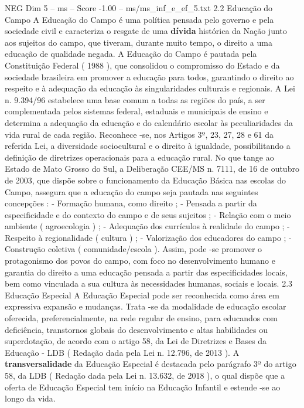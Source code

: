 \begin{textsample}{NEG Dim 5 – ms – Score -1.00 – ms/ms\_inf\_e\_ef\_5.txt}  \label{ex:f5_neg_079}
2.2 Educação do Campo A Educação do Campo é uma política pensada pelo governo e pela sociedade civil e caracteriza o resgate de uma \textbf{dívida} histórica da Nação junto aos sujeitos do campo, que tiveram, durante muito tempo, o direito a uma educação de qualidade negada.
A Educação do Campo é pautada pela Constituição Federal ( 1988 ), que consolidou o compromisso do Estado e da sociedade brasileira em promover a educação para todos, garantindo o direito ao respeito e à adequação da educação às singularidades culturais e regionais.
A Lei n. 9.394/96 estabelece uma base comum a todas as regiões do país, a ser complementada pelos sistemas federal, estaduais e municipais de ensino e determina a adequação da educação e do calendário escolar às peculiaridades da vida rural de cada região.
Reconhece -se, nos Artigos 3º, 23, 27, 28 e 61 da referida Lei, a diversidade sociocultural e o direito à igualdade, possibilitando a definição de diretrizes operacionais para a educação rural.
No que tange ao Estado de Mato Grosso do Sul, a Deliberação CEE/MS n. 7111, de 16 de outubro de 2003, que dispõe sobre o funcionamento da Educação Básica nas escolas do Campo, assegura que a educação do campo seja pautada nas seguintes concepções : - Formação humana, como direito ; - Pensada a partir da especificidade e do contexto do campo e de seus sujeitos ; - Relação com o meio ambiente ( agroecologia ) ; - Adequação dos currículos à realidade do campo ; - Respeito à regionalidade ( cultura ) ; - Valorização dos educadores do campo ; - Construção coletiva ( comunidade/escola ).
Assim, pode -se promover o protagonismo dos povos do campo, com foco no desenvolvimento humano e garantia do direito a uma educação pensada a partir das especificidades locais, bem como vinculada a sua cultura às necessidades humanas, sociais e locais. 2.3 Educação Especial A Educação Especial pode ser reconhecida como área em expressiva expansão e mudanças.
Trata -se da modalidade de educação escolar oferecida, preferencialmente, na rede regular de ensino, para educandos com deficiência, transtornos globais do desenvolvimento e altas habilidades ou superdotação, de acordo com o artigo 58, da Lei de Diretrizes e Bases da Educação - LDB ( Redação dada pela Lei n. 12.796, de 2013 ).
A \textbf{transversalidade} da Educação Especial é destacada pelo parágrafo 3º do artigo 58, da LDB ( Redação dada pela Lei n. 13.632, de 2018 ), o qual dispõe que a oferta de Educação Especial tem início na Educação Infantil e estende -se ao longo da vida.

\end{textsample}
